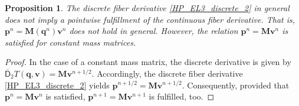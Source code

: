 \documentclass{multibody2023_full_paper}
\newtheorem{theorem}{Theorem}[section]
\newtheorem{proposition}[theorem]{Proposition}
\DeclareMathOperator{\D}{D}
\newcommand{\inv}{^{-1}}
\renewcommand{\vec}[1]{\ensuremath{\mbox{$\mathbf{#1}$}}}
\newcommand{\DG}{\overline{\mathsf{D}}}
\newcommand{\npe}{^{n+1}}
\newcommand{\npeh}{^{n+1/2}}
\newcommand{\n}{^{n}}
\begin{document}

\begin{proposition}
    The discrete fiber derivative \eqref{HP_EL3_discrete_2} in general does not imply a pointwise fulfillment of the continuous fiber derivative. That is, $\vec{p}\n = \vec{M}(\vec{q}\n)\vec{ v}\n$ does not hold in general. However, the relation $\vec{p}\n = \vec{M}\vec{ v}\n$ is satisfied for constant mass matrices.
\end{proposition}
\begin{proof}
    In the case of a constant mass matrix, the discrete derivative is given by $\DG_2 T (\vec{q},\vec{v}) = \vec{M} \vec{v}\npeh$. Accordingly, the discrete fiber derivative \eqref{HP_EL3_discrete_2} yields $\vec{p}\npeh = \vec{M} \vec{v}\npeh$. Consequently, provided that $\vec{p}\n = \vec{M} \vec{v}\n$ is satisfied, $\vec{p}\npe = \vec{M} \vec{v}\npe$ is fulfilled, too.
\end{proof}

\end{document}
